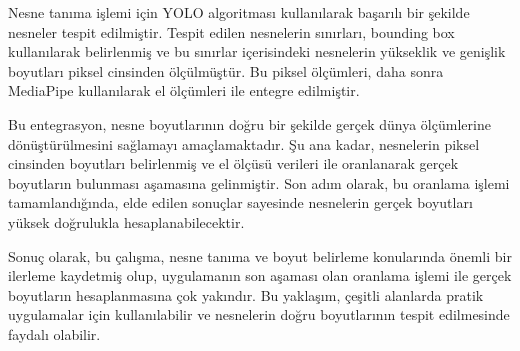 \documentclass[11pt,a4paper]{report}
\begin{document}
   Nesne tanıma işlemi için YOLO algoritması kullanılarak başarılı bir şekilde nesneler tespit edilmiştir. Tespit edilen nesnelerin sınırları, bounding box kullanılarak belirlenmiş ve bu sınırlar içerisindeki nesnelerin yükseklik ve genişlik boyutları piksel cinsinden ölçülmüştür. Bu piksel ölçümleri, daha sonra MediaPipe kullanılarak el ölçümleri ile entegre edilmiştir.
   
   Bu entegrasyon, nesne boyutlarının doğru bir şekilde gerçek dünya ölçümlerine dönüştürülmesini sağlamayı amaçlamaktadır. Şu ana kadar, nesnelerin piksel cinsinden boyutları belirlenmiş ve el ölçüsü verileri ile oranlanarak gerçek boyutların bulunması aşamasına gelinmiştir. Son adım olarak, bu oranlama işlemi tamamlandığında, elde edilen sonuçlar sayesinde nesnelerin gerçek boyutları yüksek doğrulukla hesaplanabilecektir.
   \newline
   
   Sonuç olarak, bu çalışma, nesne tanıma ve boyut belirleme konularında önemli bir ilerleme kaydetmiş olup, uygulamanın son aşaması olan oranlama işlemi ile gerçek boyutların hesaplanmasına çok yakındır. Bu yaklaşım, çeşitli alanlarda pratik uygulamalar için kullanılabilir ve nesnelerin doğru boyutlarının tespit edilmesinde faydalı olabilir.
   
   \begin{justify}
   \end{justify}
   
	
	
\end{document}
